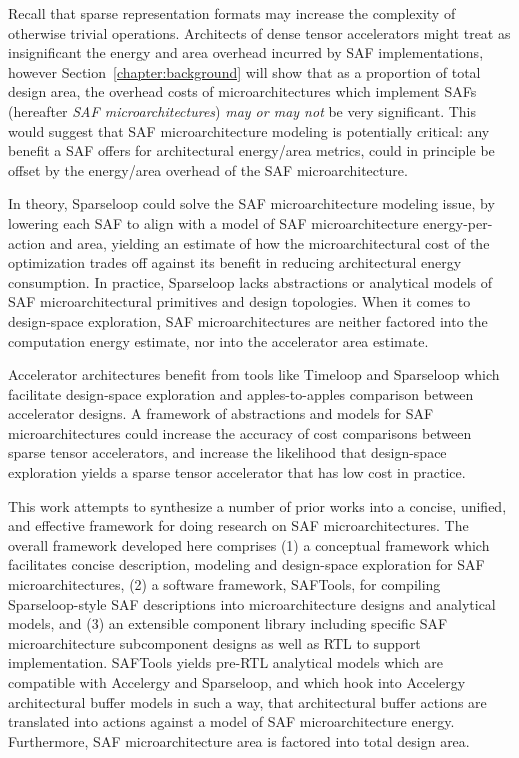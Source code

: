 Recall that sparse representation formats may increase the complexity of otherwise trivial operations. Architects of dense tensor accelerators might treat as insignificant the energy and area overhead incurred by SAF implementations, however Section~\ref{chapter:background} will show that as a proportion of total design area, the overhead costs of microarchitectures which implement SAFs (hereafter \textit{SAF microarchitectures}) \textit{may or may not} be very significant. This would suggest that SAF microarchitecture modeling is potentially critical: any benefit a SAF offers for architectural energy/area metrics, could in principle be offset by the energy/area overhead of the SAF microarchitecture.

In theory, Sparseloop could solve the SAF microarchitecture modeling issue, by lowering each SAF to align with a model of SAF microarchitecture energy-per-action and area, yielding an estimate of how the microarchitectural cost of the optimization trades off against its benefit in reducing architectural energy consumption. In practice, Sparseloop lacks abstractions or analytical models of SAF microarchitectural primitives and design topologies. When it comes to design-space exploration, SAF microarchitectures are neither factored into the computation energy estimate, nor into the accelerator area estimate.

Accelerator architectures benefit from tools like Timeloop and Sparseloop which facilitate design-space exploration and apples-to-apples comparison between accelerator designs. A framework of abstractions and models for SAF microarchitectures could increase the accuracy of cost comparisons between sparse tensor accelerators, and increase the likelihood that design-space exploration yields a sparse tensor accelerator that has low cost in practice.

This work attempts to synthesize a number of prior works into a concise, unified, and effective framework for doing research on SAF microarchitectures. The overall framework developed here comprises (1) a conceptual framework which facilitates concise description, modeling and design-space exploration for SAF microarchitectures, (2) a software framework, SAFTools, for compiling Sparseloop-style SAF descriptions into microarchitecture designs and analytical models, and (3) an extensible component library including specific SAF microarchitecture subcomponent designs as well as RTL to support implementation. SAFTools yields pre-RTL analytical models which are compatible with Accelergy and Sparseloop, and which hook into Accelergy architectural buffer models in such a way, that architectural buffer actions are translated into actions against a model of SAF microarchitecture energy. Furthermore, SAF microarchitecture area is factored into total design area. 

